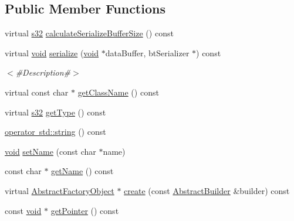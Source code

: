 \subsection*{Public Member Functions}
\begin{DoxyCompactItemize}
\item 
virtual \mbox{\hyperlink{_util_8h_aa62c75d314a0d1f37f79c4b73b2292e2}{s32}} \mbox{\hyperlink{classnjli_1_1_dropdown_h_u_d_af8d949b42c2d39536ce2f5656b2c2532}{calculate\+Serialize\+Buffer\+Size}} () const
\item 
virtual \mbox{\hyperlink{_thread_8h_af1e856da2e658414cb2456cb6f7ebc66}{void}} \mbox{\hyperlink{classnjli_1_1_dropdown_h_u_d_a19985f39f0f49c11109a10a34e293281}{serialize}} (\mbox{\hyperlink{_thread_8h_af1e856da2e658414cb2456cb6f7ebc66}{void}} $\ast$data\+Buffer, bt\+Serializer $\ast$) const
\begin{DoxyCompactList}\small\item\em $<$\#\+Description\#$>$ \end{DoxyCompactList}\item 
virtual const char $\ast$ \mbox{\hyperlink{classnjli_1_1_dropdown_h_u_d_a202580d3713b77451e35589143df3638}{get\+Class\+Name}} () const
\item 
virtual \mbox{\hyperlink{_util_8h_aa62c75d314a0d1f37f79c4b73b2292e2}{s32}} \mbox{\hyperlink{classnjli_1_1_dropdown_h_u_d_acc19fe8d89c4f9b2d067dee5271b7230}{get\+Type}} () const
\item 
\mbox{\hyperlink{classnjli_1_1_dropdown_h_u_d_a314a7ca2aca3e7ceb417097ee5e01470}{operator std\+::string}} () const
\item 
\mbox{\hyperlink{_thread_8h_af1e856da2e658414cb2456cb6f7ebc66}{void}} \mbox{\hyperlink{classnjli_1_1_dropdown_h_u_d_a087eb5f8d9f51cc476f12f1d10a3cb95}{set\+Name}} (const char $\ast$name)
\item 
const char $\ast$ \mbox{\hyperlink{classnjli_1_1_dropdown_h_u_d_ad41266885be835f3ee602311e20877a4}{get\+Name}} () const
\item 
virtual \mbox{\hyperlink{classnjli_1_1_abstract_factory_object}{Abstract\+Factory\+Object}} $\ast$ \mbox{\hyperlink{classnjli_1_1_dropdown_h_u_d_a83a8876ae63b92804004cf3febe76573}{create}} (const \mbox{\hyperlink{classnjli_1_1_abstract_builder}{Abstract\+Builder}} \&builder) const
\item 
const \mbox{\hyperlink{_thread_8h_af1e856da2e658414cb2456cb6f7ebc66}{void}} $\ast$ \mbox{\hyperlink{classnjli_1_1_dropdown_h_u_d_ac4ca71716ed832be357f15f8262c8448}{get\+Pointer}} () const
\item 

\end{DoxyCompactItemize}
